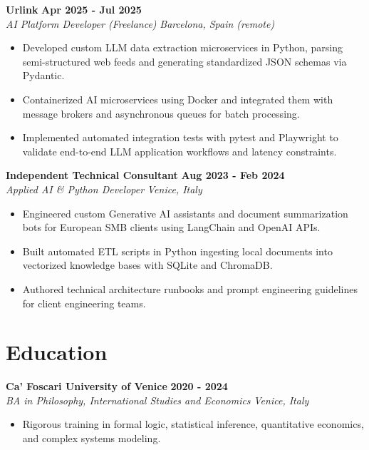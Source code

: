 \documentclass[10pt,a4paper]{article}
\newcommand{\role}[4]{%
  \textbf{#1} \hfill \textbf{#2}\\[1pt]%
  \textit{#3} \hfill \textit{#4}\\[2pt]%
}
\begin{document}
\role{Urlink}{Apr 2025 - Jul 2025}{AI Platform Developer (Freelance)}{Barcelona, Spain (remote)}
\begin{itemize}
  \item Developed custom LLM data extraction microservices in Python, parsing semi-structured web feeds and generating standardized JSON schemas via Pydantic.
  \item Containerized AI microservices using Docker and integrated them with message brokers and asynchronous queues for batch processing.
  \item Implemented automated integration tests with pytest and Playwright to validate end-to-end LLM application workflows and latency constraints.
\end{itemize}

\role{Independent Technical Consultant}{Aug 2023 - Feb 2024}{Applied AI \& Python Developer}{Venice, Italy}
\begin{itemize}
  \item Engineered custom Generative AI assistants and document summarization bots for European SMB clients using LangChain and OpenAI APIs.
  \item Built automated ETL scripts in Python ingesting local documents into vectorized knowledge bases with SQLite and ChromaDB.
  \item Authored technical architecture runbooks and prompt engineering guidelines for client engineering teams.
\end{itemize}

\section{Education}
\role{Ca' Foscari University of Venice}{2020 - 2024}{BA in Philosophy, International Studies and Economics}{Venice, Italy}
\begin{itemize}
  \item Rigorous training in formal logic, statistical inference, quantitative economics, and complex systems modeling.
\end{itemize}
\end{document}
